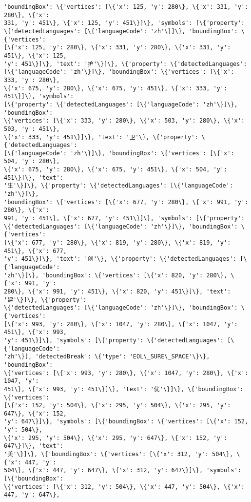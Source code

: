 \documentclass[11pt]{article}
\begin{document}
\begin{Verbatim}[commandchars=\\\{\}]
'boundingBox': \{'vertices': [\{'x': 125, 'y': 280\}, \{'x': 331, 'y': 280\}, \{'x':
331, 'y': 451\}, \{'x': 125, 'y': 451\}]\}, 'symbols': [\{'property':
\{'detectedLanguages': [\{'languageCode': 'zh'\}]\}, 'boundingBox': \{'vertices':
[\{'x': 125, 'y': 280\}, \{'x': 331, 'y': 280\}, \{'x': 331, 'y': 451\}, \{'x': 125,
'y': 451\}]\}, 'text': '护'\}]\}, \{'property': \{'detectedLanguages':
[\{'languageCode': 'zh'\}]\}, 'boundingBox': \{'vertices': [\{'x': 333, 'y': 280\},
\{'x': 675, 'y': 280\}, \{'x': 675, 'y': 451\}, \{'x': 333, 'y': 451\}]\}, 'symbols':
[\{'property': \{'detectedLanguages': [\{'languageCode': 'zh'\}]\}, 'boundingBox':
\{'vertices': [\{'x': 333, 'y': 280\}, \{'x': 503, 'y': 280\}, \{'x': 503, 'y': 451\},
\{'x': 333, 'y': 451\}]\}, 'text': '卫'\}, \{'property': \{'detectedLanguages':
[\{'languageCode': 'zh'\}]\}, 'boundingBox': \{'vertices': [\{'x': 504, 'y': 280\},
\{'x': 675, 'y': 280\}, \{'x': 675, 'y': 451\}, \{'x': 504, 'y': 451\}]\}, 'text':
'生'\}]\}, \{'property': \{'detectedLanguages': [\{'languageCode': 'zh'\}]\},
'boundingBox': \{'vertices': [\{'x': 677, 'y': 280\}, \{'x': 991, 'y': 280\}, \{'x':
991, 'y': 451\}, \{'x': 677, 'y': 451\}]\}, 'symbols': [\{'property':
\{'detectedLanguages': [\{'languageCode': 'zh'\}]\}, 'boundingBox': \{'vertices':
[\{'x': 677, 'y': 280\}, \{'x': 819, 'y': 280\}, \{'x': 819, 'y': 451\}, \{'x': 677,
'y': 451\}]\}, 'text': '创'\}, \{'property': \{'detectedLanguages': [\{'languageCode':
'zh'\}]\}, 'boundingBox': \{'vertices': [\{'x': 820, 'y': 280\}, \{'x': 991, 'y':
280\}, \{'x': 991, 'y': 451\}, \{'x': 820, 'y': 451\}]\}, 'text': '建'\}]\}, \{'property':
\{'detectedLanguages': [\{'languageCode': 'zh'\}]\}, 'boundingBox': \{'vertices':
[\{'x': 993, 'y': 280\}, \{'x': 1047, 'y': 280\}, \{'x': 1047, 'y': 451\}, \{'x': 993,
'y': 451\}]\}, 'symbols': [\{'property': \{'detectedLanguages': [\{'languageCode':
'zh'\}], 'detectedBreak': \{'type': 'EOL\_SURE\_SPACE'\}\}, 'boundingBox':
\{'vertices': [\{'x': 993, 'y': 280\}, \{'x': 1047, 'y': 280\}, \{'x': 1047, 'y':
451\}, \{'x': 993, 'y': 451\}]\}, 'text': '优'\}]\}, \{'boundingBox': \{'vertices':
[\{'x': 152, 'y': 504\}, \{'x': 295, 'y': 504\}, \{'x': 295, 'y': 647\}, \{'x': 152,
'y': 647\}]\}, 'symbols': [\{'boundingBox': \{'vertices': [\{'x': 152, 'y': 504\},
\{'x': 295, 'y': 504\}, \{'x': 295, 'y': 647\}, \{'x': 152, 'y': 647\}]\}, 'text':
'美'\}]\}, \{'boundingBox': \{'vertices': [\{'x': 312, 'y': 504\}, \{'x': 447, 'y':
504\}, \{'x': 447, 'y': 647\}, \{'x': 312, 'y': 647\}]\}, 'symbols': [\{'boundingBox':
\{'vertices': [\{'x': 312, 'y': 504\}, \{'x': 447, 'y': 504\}, \{'x': 447, 'y': 647\},

\end{Verbatim}
\end{document}
